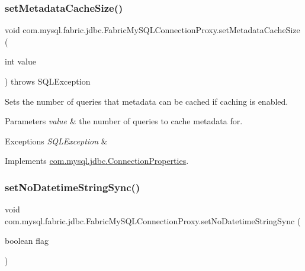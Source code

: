 \subsubsection{\texorpdfstring{set\+Metadata\+Cache\+Size()}{setMetadataCacheSize()}}
{\footnotesize\ttfamily void com.\+mysql.\+fabric.\+jdbc.\+Fabric\+My\+S\+Q\+L\+Connection\+Proxy.\+set\+Metadata\+Cache\+Size (\begin{DoxyParamCaption}\item[{int}]{value }\end{DoxyParamCaption}) throws S\+Q\+L\+Exception}

Sets the number of queries that metadata can be cached if caching is enabled.


\begin{DoxyParams}{Parameters}
{\em value} & the number of queries to cache metadata for. \\
\hline
\end{DoxyParams}

\begin{DoxyExceptions}{Exceptions}
{\em S\+Q\+L\+Exception} & \\
\hline
\end{DoxyExceptions}


Implements \mbox{\hyperlink{interfacecom_1_1mysql_1_1jdbc_1_1_connection_properties_aa29a8dc1d36b7044717dce95a3ddbc4e}{com.\+mysql.\+jdbc.\+Connection\+Properties}}.

\mbox{\label{classcom_1_1mysql_1_1fabric_1_1jdbc_1_1_fabric_my_s_q_l_connection_proxy_ad51b7b9b87850ca32269c06ce9bac11c}} 
\subsubsection{\texorpdfstring{set\+No\+Datetime\+String\+Sync()}{setNoDatetimeStringSync()}}
{\footnotesize\ttfamily void com.\+mysql.\+fabric.\+jdbc.\+Fabric\+My\+S\+Q\+L\+Connection\+Proxy.\+set\+No\+Datetime\+String\+Sync (\begin{DoxyParamCaption}\item[{boolean}]{flag }\end{DoxyParamCaption})}


